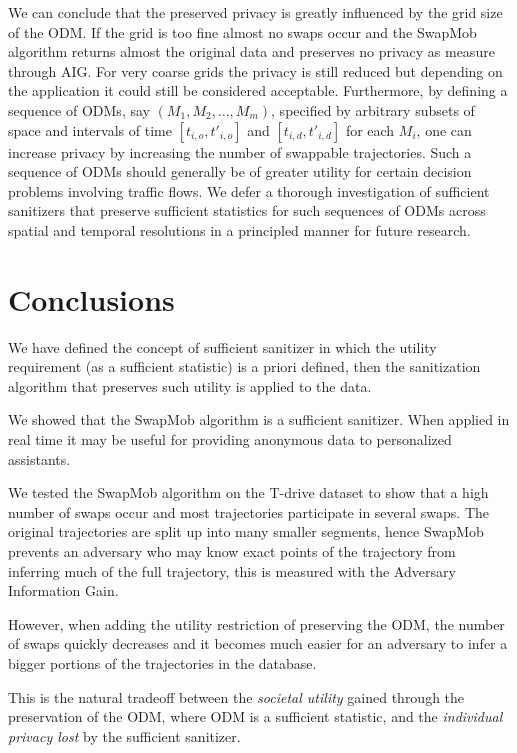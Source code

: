 \documentclass[times,twocolumn,final,authoryear]{elsarticle}
\begin{document}
We can conclude that the preserved privacy is greatly influenced by
the grid size of the ODM. If the grid is too fine almost no swaps occur
and the SwapMob algorithm returns almost the original data and preserves no privacy as measure through AIG. For very coarse grids the privacy is still reduced but depending on the application it could still
be considered acceptable. 
Furthermore, by defining a sequence of ODMs, say $(M_1,M_2,\ldots,M_m)$, specified by arbitrary subsets of space 
and intervals of time $[t_{i,o},t'_{i,o}]$ and $[t_{i,d},t'_{i,d}]$ for each $M_i$, one can increase privacy by increasing the number of swappable trajectories. Such a sequence of ODMs should generally be of greater utility for certain decision problems involving traffic flows. We defer a thorough investigation of sufficient sanitizers that preserve sufficient statistics for such sequences of ODMs across spatial and temporal resolutions in a principled manner for future research.  

\section{Conclusions}\label{Sec:conclusions}

We have defined the concept of sufficient sanitizer in which the utility requirement (as a sufficient statistic) is a priori defined, then the sanitization algorithm that preserves such utility is applied to the data.

We showed that the SwapMob algorithm is a sufficient sanitizer. When applied in real time it may be useful for providing anonymous data to personalized assistants. 

We tested the SwapMob algorithm on the T-drive dataset to show that a high number of swaps occur and
most trajectories participate in several swaps. The
original trajectories are split up into many smaller segments, hence SwapMob prevents an adversary who may know exact points of the trajectory from inferring much of the full trajectory, this is measured with the Adversary Information Gain.

However, when adding
the utility restriction of preserving the ODM, the number of swaps quickly
decreases and it becomes much easier for an
adversary to infer a bigger portions of the trajectories in the database.

This is the natural tradeoff between the {\em societal utility} gained through the preservation of the ODM, where ODM is a sufficient statistic, and the {\em individual privacy lost} by the sufficient sanitizer.
\end{document}

